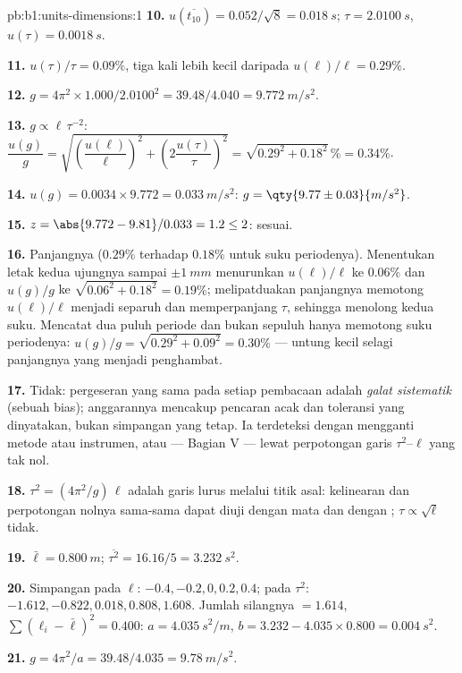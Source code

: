 \begin{solution}{pb:b1:units-dimensions:1}
\textbf{10.} $u(\overline{t_{10}}) = 0.052/\sqrt8 = \qty{0.018}{s}$;
$\tau = \qty{2.0100}{s}$, $u(\tau) = \qty{0.0018}{s}$.

\textbf{11.} $u(\tau)/\tau = 0.09\%$, tiga kali lebih kecil daripada
$u(\ell)/\ell = 0.29\%$.

\textbf{12.} $g = 4\pi^2 \times 1.000/2.0100^2 = 39.48/4.040 =
\qty{9.772}{m/s^2}$.

\textbf{13.} $g \propto \ell\,\tau^{-2}$:
$\dfrac{u(g)}{g} = \sqrt{\left(\dfrac{u(\ell)}{\ell}\right)^2
+ \left(2\dfrac{u(\tau)}{\tau}\right)^2} = \sqrt{0.29^2 + 0.18^2}\,\%
= 0.34\%$.

\textbf{14.} $u(g) = 0.0034 \times 9.772 = \qty{0.033}{m/s^2}$:
$g = \qty{9.77\pm0.03}{m/s^2}$.

\textbf{15.} $z = \abs{9.772 - 9.81}/0.033 = 1.2 \leq 2$: sesuai.

\textbf{16.} Panjangnya ($0.29\%$ terhadap $0.18\%$ untuk suku periodenya).
Menentukan letak kedua ujungnya sampai $\pm\qty{1}{mm}$ menurunkan $u(\ell)/\ell$ ke
$0.06\%$ dan $u(g)/g$ ke $\sqrt{0.06^2 + 0.18^2} = 0.19\%$; melipatduakan
panjangnya memotong $u(\ell)/\ell$ menjadi separuh dan memperpanjang $\tau$,
sehingga menolong kedua suku. Mencatat dua puluh periode dan bukan sepuluh
hanya memotong suku periodenya: $u(g)/g = \sqrt{0.29^2 + 0.09^2} = 0.30\%$ ---
untung kecil selagi panjangnya yang menjadi penghambat.

\textbf{17.} Tidak: pergeseran yang sama pada setiap pembacaan adalah
\emph{galat sistematik} (sebuah bias); anggarannya mencakup pencaran acak dan
toleransi yang dinyatakan, bukan simpangan yang tetap. Ia terdeteksi dengan
mengganti metode atau instrumen, atau --- Bagian V --- lewat perpotongan
garis $\tau^2$--$\ell$ yang tak nol.

\textbf{18.} $\tau^2 = (4\pi^2/g)\,\ell$ adalah garis lurus melalui titik
asal: kelinearan dan perpotongan nolnya sama-sama dapat diuji dengan mata dan
dengan ; $\tau \propto \sqrt\ell$ tidak.

\textbf{19.} $\bar\ell = \qty{0.800}{m}$; $\overline{\tau^2} = 16.16/5 =
\qty{3.232}{s^2}$.

\textbf{20.} Simpangan pada $\ell$: $-0.4, -0.2, 0, 0.2, 0.4$; pada
$\tau^2$: $-1.612, -0.822, 0.018, 0.808, 1.608$. Jumlah silangnya $= 1.614$,
$\sum(\ell_i - \bar\ell)^2 = 0.400$: $a = \qty{4.035}{s^2/m}$,
$b = 3.232 - 4.035 \times 0.800 = \qty{0.004}{s^2}$.

\textbf{21.} $g = 4\pi^2/a = 39.48/4.035 = \qty{9.78}{m/s^2}$.


\end{solution}
